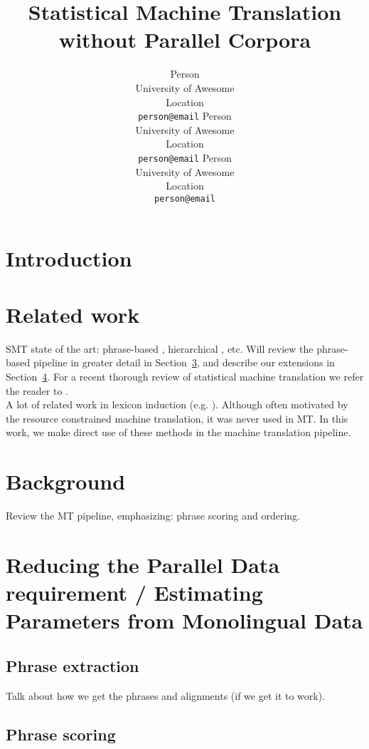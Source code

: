 \documentclass[11pt]{article}
\title{Statistical Machine Translation without Parallel Corpora}
\author{Person\\
  University of Awesome\\
  Location\\
  {\tt person@email}  \And
  Person\\
  University of Awesome\\
  Location\\
  {\tt  person@email}   \And
  Person\\
  University of Awesome\\
  Location\\
  {\tt  person@email}}
\date{}
\newcommand{\secref}[1]{Section~\ref{#1}}
\begin{document}
\maketitle
\begin{abstract}
\end{abstract}

\section{Introduction} \label{sect:intro}


\section{Related work} \label{sect:relwork}

SMT state of the art: phrase-based \cite{Koehn:2003}, hierarchical \cite{Chiang:2005}, etc.  Will review the phrase-based pipeline in greater detail in \secref{sect:bckg}, and describe our extensions in \secref{sect:mono}. For a recent thorough review of statistical machine translation we refer the reader to \cite{Lopez:2008}.\\

A lot of related work in lexicon induction (e.g. \cite{Rapp:1995,Fung:1998,Koehn:2000,Haghighi:2008,Mimno:2009}).  Although often motivated by the resource constrained machine translation, it was never used in MT.  In this work, we make direct use of these methods in the machine translation pipeline.

\section{Background} \label{sect:bckg}

Review the MT pipeline, emphasizing: phrase scoring and ordering.

\section{Reducing the Parallel Data requirement / Estimating Parameters from Monolingual Data} \label{sect:mono}

\subsection{Phrase extraction}  \label{sect:extract}

Talk about how we get the phrases and alignments (if we get it to work).

\subsection{Phrase scoring} \label{sect:score}
\end{document}

